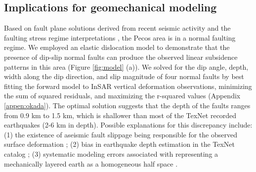 \documentclass{utexasthesis}
\begin{document}
\subsection{Implications for geomechanical modeling}
Based on fault plane solutions derived from recent seismic activity and the faulting stress regime interpretations \citep{LundSnee2018StateStressPermian}, the Pecos area is in a normal faulting regime. We employed an elastic dislocation model \citep{Okada1992InternalDeformationDue} to demonstrate that the presence of dip-slip normal faults can produce the observed linear subsidence patterns in this area (Figure \ref{fig:model} (a)). We solved for the dip angle, depth, width along the dip direction, and slip magnitude of four normal faults by best fitting the forward model to InSAR vertical deformation observations, minimizing the sum of squared residuals, and maximizing the r-squared values \citep{Du1992ComparisonVariousInversion} (Appendix \ref{appen:okada}). The optimal solution suggests that the depth of the faults ranges from 0.9 km to 1.5 km, which is shallower than most of the TexNet recorded earthquakes (2-6 km in depth). Possible explanations for this discrepancy include: (1) the existence of aseismic fault slippage being responsible for the observed surface deformation \citep{McGarr2017WastewaterDisposalEarthquake}; (2) bias in earthquake depth estimation in the TexNet catalog \citep{Lomax2019ImprovingAbsoluteEarthquake}; (3) systematic modeling errors associated with representing a mechanically layered earth as a homogeneous half space \citep{Du1992ComparisonVariousInversion}. 
\end{document}
